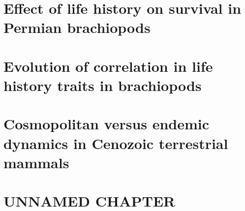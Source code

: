 \documentclass[12pt,letterpaper]{article}
\begin{document}
\section{Effect of life history on survival in Permian brachiopods}

\section{Evolution of correlation in life history traits in brachiopods}

\section{Cosmopolitan versus endemic dynamics in Cenozoic terrestrial mammals}

\section{UNNAMED CHAPTER}



\end{document}
